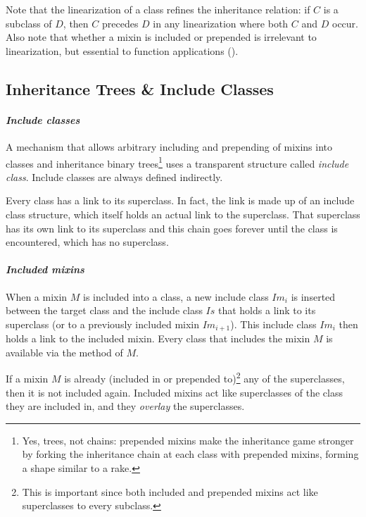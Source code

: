 Note that the linearization of a class refines the inheritance relation: if $C$ is a subclass of $D$, then $C$ precedes $D$ in any linearization where both $C$ and $D$ occur. Also note that whether a mixin is included or prepended is irrelevant to linearization, but essential to function applications ().


\subsection{Inheritance Trees \& Include Classes}
\label{sec:inheritance-trees}
\label{sec:include-classes}

\paragraph{\em Include classes}
A mechanism that allows arbitrary including and prepending of mixins into classes and inheritance binary trees\footnote{Yes, trees, not chains: prepended mixins make the inheritance game stronger by forking the inheritance chain at each class with prepended mixins, forming a shape similar to a rake.} uses a transparent structure called {\em include class}. Include classes are always defined indirectly.

Every class has a link to its superclass. In fact, the link is made up of an include class structure, which itself holds an actual link to the superclass. That superclass has its own link to its superclass and this chain goes forever until the  class is encountered, which has no superclass. 

\paragraph{\em Included mixins}
When a mixin $M$ is included into a class, a new include class $Im_i$ is inserted between the target class and the include class $Is$ that holds a link to its superclass (or to a previously included mixin $Im_{i+1}$). This include class $Im_i$ then holds a link to the included mixin. Every class that includes the mixin $M$ is available via the  method of $M$. 

If a mixin $M$ is already (included in or prepended to)\footnote{This is important since both included and prepended mixins act like superclasses to every subclass.} any of the superclasses, then it is not included again. Included mixins act like superclasses of the class they are included in, and they {\em overlay} the superclasses. 

